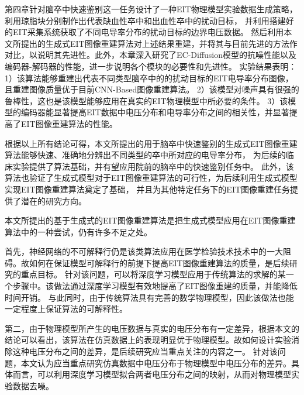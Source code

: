 第四章针对脑卒中快速鉴别这一任务设计了一种EIT物理模型实验数据生成策略，利用琼脂块分别制作出代表缺血性卒中和出血性卒中的扰动目标，
并利用搭建好的EIT采集系统获取了不同电导率分布的扰动目标的边界电压数据。
然后利用本文所提出的生成式EIT图像重建算法对上述结果重建，并将其与目前先进的方法作对比，以说明其先进性。此外，本章深入研究了EC-Diffusion模型的抗噪性能以及编码器-解码器的性能，进一步说明各个模块的必要性和先进性。
实验结果表明：
1）该算法能够重建出代表不同类型脑卒中的的扰动目标的EIT电导率分布图像，且重建图像质量优于目前CNN-Based图像重建算法。
2）该模型对噪声具有很强的鲁棒性，这也是该模型能够应用在真实的EIT物理模型中所必要的条件。
3）该模型的编码器能显著提高EIT数据中电压分布和电导率分布之间的相关性，并显著提高了EIT图像重建算法的性能。


根据以上所有结论可得，本文所提出的用于脑卒中快速鉴别的生成式EIT图像重建算法能够快速、准确地分辨出不同类型的卒中所对应的电导率分布，
为后续的临床实验提供了算法基础，并有望应用院前的脑卒中的快速鉴别任务中。
此外，该算法也验证了生成式模型对于EIT图像重建算法的可行性，为后续利用生成式模型实现EIT图像重建算法奠定了基础，
并且为其他特定任务下的EIT图像重建任务提供了潜在的研究方向。
 
 
本文所提出的基于生成式的EIT图像重建算法是把生成式模型应用在EIT图像重建算法中的一种尝试，仍有许多不足之处。
 
首先，神经网络的不可解释行仍是该类算法应用在医学检验技术技术中的一大阻碍。故如何在保证模型可解释行的前提下提高EIT图像重建算法的质量，是后续研究的重点目标。
针对该问题，可以将深度学习模型应用于传统算法的求解的某一个步骤中。该做法通过深度学习模型有效地提高了EIT图像重建的质量，并能降低时间开销。
与此同时，由于传统算法具有完善的数学物理模型，因此该做法也能一定程度上保证算法的可解释性。
 
第二，由于物理模型所产生的电压数据与真实的电压分布有一定差异，根据本文的结论可以看出，该算法在仿真数据上的表现明显优于物理模型。故如何设计实验消除这种电压分布之间的差异，是后续研究应当重点关注的内容之一。
针对该问题，本文认为应当重点研究仿真数据中电压分布于物理模型中电压分布的差异。具体而言，可以利用深度学习模型拟合两者电压分布之间的映射，从而对物理模型实验数据去噪。